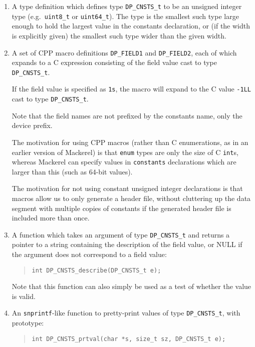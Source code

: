 \documentclass[a4paper,11pt,twoside]{report}
\begin{document}
\begin{enumerate}

\item A type definition which defines type \texttt{DP\_CNSTS\_t} to be
  an unsigned integer type (e.g.\ \texttt{uint8\_t} or
  \texttt{uint64\_t}).  The type is the smallest such type large
  enough to hold the largest value in the constants declaration, or
  (if the width is explicitly given) the smallest such type wider than
  the given width. 

\item A set of CPP macro definitions \texttt{DP\_FIELD1} and
  \texttt{DP\_FIELD2}, each of which expands to a C expression
  consisting of the field value cast to type \texttt{DP\_CNSTS\_t}.  

  If the field value is specified as \texttt{1s}, the macro will
  expand to the C value \texttt{-1LL} cast to type
  \texttt{DP\_CNSTS\_t}.  

  Note that the field names are not prefixed by the constants name,
  only the device prefix. 

  The motivation for using CPP macros (rather than C enumerations, as
  in an earlier version of Mackerel) is that \texttt{enum} types are
  only the size of C \texttt{int}s, whereas Mackerel can specify
  values in \texttt{constants} declarations which are larger than
  this (such as 64-bit values). 

  The motivation for not using constant unsigned integer declarations
  is that macros allow us to only generate a header file, without
  cluttering up the data segment with multiple copies of constants if
  the generated header file is included more than once. 
      
\item A function which takes an argument of type \texttt{DP\_CNSTS\_t}
  and returns a pointer to a string containing the description of the
  field value, or NULL if the argument does not correspond to a field
  value:
  \begin{quote}
    \texttt{int DP\_CNSTS\_describe(DP\_CNSTS\_t e);}
  \end{quote}
  Note that this function can also simply be used as a test of whether
  the value is valid. 

\item An \texttt{snprintf}-like function to pretty-print values of
  type \texttt{DP\_CNSTS\_t}, with prototype:
  \begin{quote}
    \texttt{int DP\_CNSTS\_prtval(char *s, size\_t sz, DP\_CNSTS\_t e);}
  \end{quote}

\end{enumerate}
\end{document}
